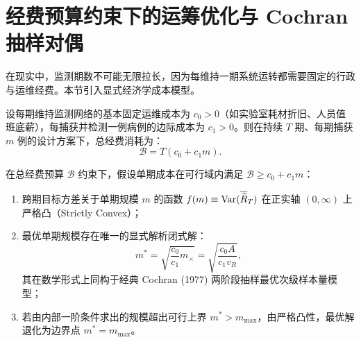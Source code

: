 \section{经费预算约束下的运筹优化与 Cochran 抽样对偶}\label{sec:prop5_cochran}

在现实中，监测期数不可能无限拉长，因为每维持一期系统运转都需要固定的行政与运维经费。本节引入显式经济学成本模型。

设每期维持监测网络的基本固定运维成本为 $c_0 > 0$（如实验室耗材折旧、人员值班底薪），每捕获并检测一例病例的边际成本为 $c_1 > 0$。则在持续 $T$ 期、每期捕获 $m$ 例的设计方案下，总经费消耗为：
\begin{equation}
\mathcal{B} = T (c_0 + c_1 m). \label{eq:cost_budget}
\end{equation}

\begin{corollary}\label{cor:cochran}
在总经费预算 $\mathcal{B}$ 约束下，假设单期成本在可行域内满足 $\mathcal{B} \ge c_0 + c_1 m$：
\begin{enumerate}[label=(\roman*)]
    \item 跨期目标方差关于单期规模 $m$ 的函数 $f(m) \equiv \operatorname{Var}(\overline{\widehat{R}}_T)$ 在正实轴 $(0, \infty)$ 上严格凸（Strictly Convex）；
    \item 最优单期规模存在唯一的显式解析闭式解：
    \begin{equation}
    m^* = \sqrt{\frac{c_0}{c_1} m_\times} = \sqrt{\frac{c_0 A}{c_1 v_R}}, \label{eq:m_star_closed}
    \end{equation}
    其在数学形式上同构于经典 Cochran (1977) 两阶段抽样最优次级样本量模型；
    \item 若由内部一阶条件求出的规模超出可行上界 $m^* > m_{\max}$，由严格凸性，最优解退化为边界点 $m^* = m_{\max}$。
\end{enumerate}
\end{corollary}

